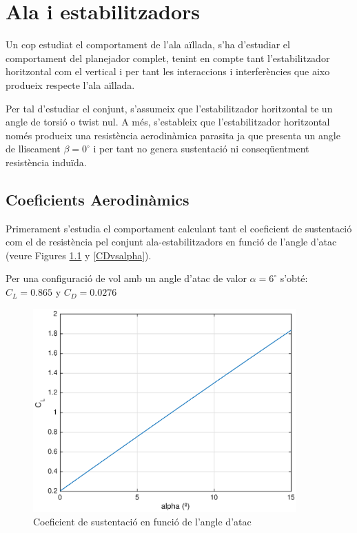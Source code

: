 \chapter{Ala i estabilitzadors}

Un cop estudiat el comportament de l'ala aïllada, s'ha d'estudiar el comportament del planejador complet, tenint en compte tant l'estabilitzador horitzontal com el vertical i per tant les interaccions i interferències que aixo produeix respecte l'ala aïllada. 

Per tal d'estudiar el conjunt, s'assumeix que l'estabilitzador horitzontal te un angle de torsió o twist nul. A més, s'estableix que l'estabilitzador horitzontal només produeix una resistència aerodinàmica parasita ja que presenta un angle de lliscament $\beta=0^{\circ}$ i per tant no genera sustentació ni conseqüentment resistència induïda. 

\section{Coeficients Aerodinàmics}

Primerament s'estudia el comportament calculant tant el coeficient de sustentació com el de resistència pel conjunt ala-estabilitzadors en funció de l'angle d'atac (veure Figures \ref{CLvsalpha} y \ref{CDvsalpha}).

Per una configuració de vol amb un angle d'atac de valor $\alpha=6^{\circ}$ s'obté: $C_{L} = 0.865 $ y $C_{D} = 0.0276 $

\begin{figure}[h]
	\centering
	\includegraphics[width=0.9\textwidth]{./plots/CLvsalpha_4}
	\caption{Coeficient de sustentació en funció de l'angle d'atac}
	\label{CLvsalpha}
\end{figure}

